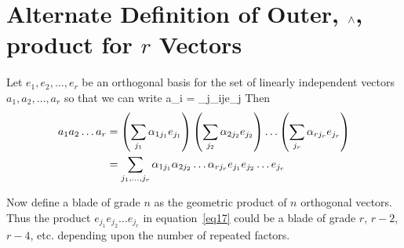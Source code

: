 \section{Alternate Definition of Outer, $\wedge$, product for $r$
Vectors}

Let $e_{1},e_{2},\dots,e_{r}$ be an orthogonal basis for the set of 
linearly independent vectors $a_{1},a_{2},\dots,a_{r}$ so that we can
write
\be\label{eq16}
	a_{i} = \sum_{j}\alpha_{ij}e_{j}
\ee
Then
\begin{align}
	a_{1}a_{2}\dots a_{r} & =  \left ( {\sum_{j_{1}}\alpha_{1j_{1}}
				   e_{j_{1}}} \right ) 
	\left ( {\sum_{j_{2}}\alpha_{2j_{2}}e_{j_{2}}} \right )
	\dots\left ( {\sum_{j_{r}}\alpha_{rj_{r}}
	e_{j_{r}}} \right ) \nonumber \\
	& = \sum_{{j_{1}},\dots,{j_{r}}}\alpha_{1j_{1}}\alpha_{2j_{2}}\dots\alpha_{rj_{r}}
	      e_{j_{1}}e_{j_{2}}\dots e_{j_{r}} \label{eq17}
\end{align}

Now define a blade of grade $n$ as the geometric product of $n$ orthogonal vectors. Thus the 
product $e_{j_{1}}e_{j_{2}}\dots e_{j_{r}}$ in equation~\ref{eq17}
could be a blade of grade $r$, $r-2$, $r-4$, etc. depending upon the number of repeated factors.

